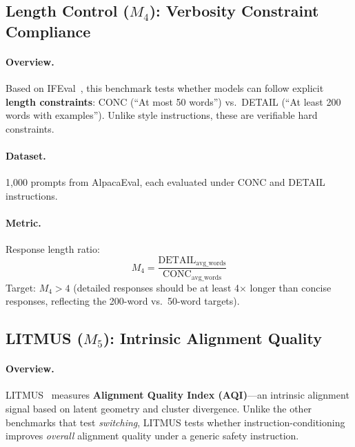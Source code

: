 \subsection{Length Control ($M_4$): Verbosity Constraint Compliance}
\label{sec:appendix_length_control}

\paragraph{Overview.} Based on IFEval~\cite{zhou2023ifeval}, this benchmark tests whether models can follow explicit \textbf{length constraints}: CONC (``At most 50 words'') vs.\ DETAIL (``At least 200 words with examples''). Unlike style instructions, these are verifiable hard constraints.

\paragraph{Dataset.} 1,000 prompts from AlpacaEval, each evaluated under CONC and DETAIL instructions.

\paragraph{Metric.} Response length ratio:
\begin{equation*}
    M_4 = \frac{\text{DETAIL}_{\text{avg\_words}}}{\text{CONC}_{\text{avg\_words}}}
\end{equation*}
Target: $M_4 > 4$ (detailed responses should be at least 4$\times$ longer than concise responses, reflecting the 200-word vs.\ 50-word targets).

\subsection{LITMUS ($M_5$): Intrinsic Alignment Quality}
\label{sec:appendix_litmus}

\paragraph{Overview.} LITMUS~\cite{borah-etal-2025-alignment} measures \textbf{Alignment Quality Index (AQI)}---an intrinsic alignment signal based on latent geometry and cluster divergence. Unlike the other benchmarks that test \emph{switching}, LITMUS tests whether instruction-conditioning improves \emph{overall} alignment quality under a generic safety instruction.

